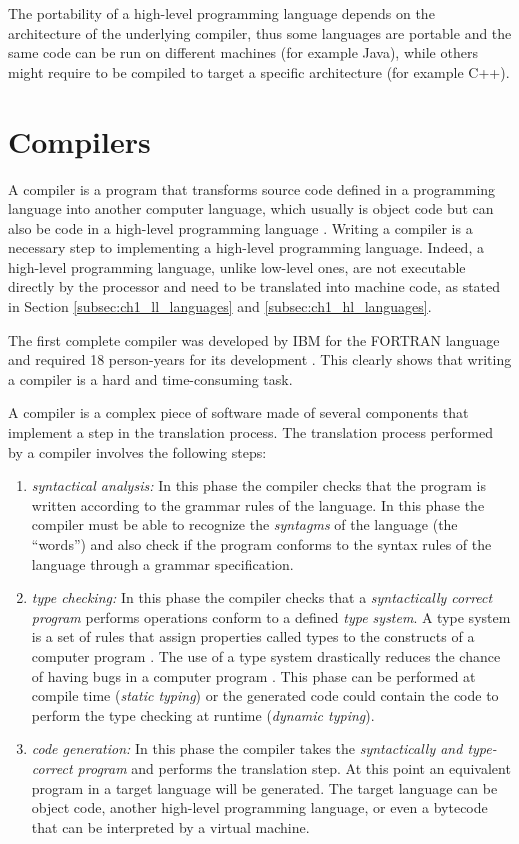 The portability of a high-level programming language depends on the architecture of the underlying compiler, thus some languages are portable and the same code can be run on different machines (for example Java), while others might require to be compiled to target a specific architecture (for example C++).

\section{Compilers}
\label{sec:ch1_compilers}
A compiler is a program that transforms source code defined in a programming language into another computer language, which usually is object code but can also be code in a high-level programming language \cite{aho2007compilers, appel2002javacompiler}. Writing a compiler is a necessary step to implementing a high-level programming language. Indeed, a high-level programming language, unlike low-level ones, are not executable directly by the processor and need to be translated into machine code, as stated in Section \ref{subsec:ch1_ll_languages} and \ref{subsec:ch1_hl_languages}.

The first complete compiler was developed by IBM for the FORTRAN language and required 18 person-years for its development \cite{backus1957fortran}. This clearly shows that writing a compiler is a hard and time-consuming task.

A compiler is a complex piece of software made of several components that implement a step in the translation process. The translation process performed by a compiler involves the following steps:

\begin{enumerate}
	\item \textit{syntactical analysis:} In this phase the compiler checks that the program is written according to the grammar rules of the language. In this phase the compiler must be able to recognize the \textit{syntagms} of the language (the ``words'') and also check if the program conforms to the syntax rules of the language through a grammar specification.
	\item \textit{type checking:} In this phase the compiler checks that a \textit{syntactically correct program} performs operations conform to a defined \textit{type system}. A type system is a set of rules that assign properties called types to the constructs of a computer program \cite{pierce2002types}. The use of a type system drastically reduces the chance of having bugs in a computer program \cite{cardelli1996type} . This phase can be performed at compile time (\textit{static typing}) or the generated code could contain the code to perform the type checking at runtime (\textit{dynamic typing}). 
	\item \textit{code generation:} In this phase the compiler takes the \textit{syntactically and type-correct program} and performs the translation step. At this point an equivalent program in a target language will be generated. The target language can be object code, another high-level programming language, or even a bytecode that can be interpreted by a virtual machine.
\end{enumerate}

